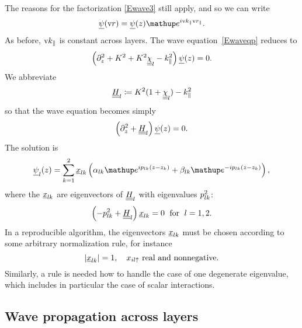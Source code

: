 The reasons for the factorization \cref{Ewave3} still apply,
and so we can write
\begin{equation}\label{Ewave3p}
\u\psi(\r) = \u\psi(z) \e^{i \k_\parallel\r_\parallel}.
\end{equation}
As before, $\text{v}{k}_\parallel$ is constant across layers.
The wave equation~\cref{Ewaveqp} reduces to
\begin{equation}\label{Ewavezp}
\left(\partial_z^2 + K^2 + K^2\underline{\underline{\chi}}_l - k_\parallel^2 \right) \underline{\psi}(z) = 0.
\end{equation}
We abbreviate
\begin{equation}
  \underline{\underline{H}}_l \coloneqq  K^2(1+\underline{\underline{\chi}}_l)-k_\parallel^2
\end{equation}
so that the wave equation becomes simply
\begin{equation}\label{Ewaveqp2}
  \left(\partial_z^2 + \underline{\underline{H}}_l\right) \underline{\psi}(z) = 0.
\end{equation}
The solution is
\begin{equation}\label{Epsizp}
  \u\psi_\il(z)
  = \sum_{k=1}^2 \u x_{\il k}\left(\alpha_{\il k}\e^{i p_{\il k}(z-z_k)}
                            + \beta_{\il k}\e^{-i p_{\il k}(z-z_k)}\right),
\end{equation}
where the $\underline{x}_{l k}$ are eigenvectors of $\underline{\underline{H}}_l$
with eigenvalues $p_{l k}^2$:
\begin{equation}
  \left( -p_{l k}^2 + \underline{\underline{H}}_l \right) \underline{x}_{l k} = 0
   \;\text{ for }\;l=1,2.
\end{equation}
In a reproducible algorithm,
the eigenvectors $\underline{x}_{l k}$ must be chosen according to some arbitrary
normalization rule,
for instance
\begin{equation}
  |\underline{x}_{l k}|=1,\quad x_{il\uparrow} \text{ real and nonnegative}.
\end{equation}
Similarly,
a rule is needed how to handle the case of one degenerate eigenvalue,
which includes in particular the case of scalar interactions.


\subsection{Wave propagation across layers}

